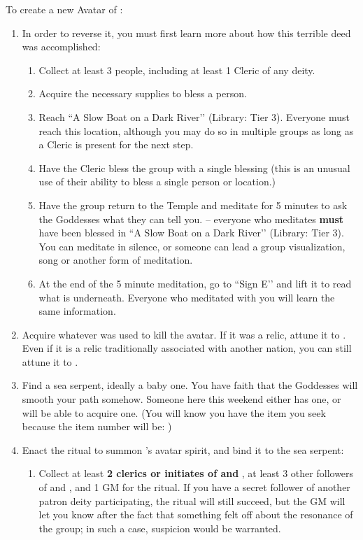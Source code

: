 \documentclass[green]{GL2020}
\begin{document}
To create a new Avatar of \cEbb{}:
\begin{enumerate}
  \item In order to reverse it, you must first learn more about how this terrible deed was accomplished: 
\begin{enumerate}
	\item Collect at least 3 people, including at least 1 Cleric of any deity.
	\item Acquire the  necessary supplies to bless a person.
	\item Reach ``A Slow Boat on a Dark River’’ (Library: Tier 3). Everyone must reach this location, although you may do so in multiple groups as long as a Cleric is present for the next step.
	\item Have the Cleric bless the group with a single blessing (this is an unusual use of their ability to bless a single person or location.)
	\item Have the group return to the Temple and meditate for 5 minutes to ask the Goddesses what they can tell you. -- everyone who meditates \textbf{must} have been blessed in ``A Slow Boat on a Dark River’’ (Library: Tier 3). You can meditate in silence, or someone can lead a group visualization, song or another form of meditation.
	\item At the end of the 5 minute meditation, go to ``Sign E’’ and lift it to read what is underneath. Everyone who meditated with you will learn the same information.
\end{enumerate}
  \item Acquire whatever was used to kill the \cEbb{} avatar. If it was a relic, attune it to \pShip{}. Even if it is a relic traditionally associated with another nation, you can still attune it to \pShip{}.
  \item Find a sea serpent, ideally a baby one. You have faith that the Goddesses will smooth your path somehow. Someone here this weekend either has one, or will be able to acquire one. (You will know you have the item you seek because the item number will be: \iBabySeaSerpent{\MYnumber})
  \item Enact the ritual to summon \cEbb{}’s avatar spirit, and bind it to the sea serpent:
  \begin{enumerate}
    \item Collect at least \textbf{2 clerics or initiates of \cEbb{} and \cFlow{}}, at least 3 other followers of \cEbb{} and \cFlow{}, and 1 GM for the ritual. If you have a secret follower of another patron deity participating, the ritual will still succeed, but the GM will let you know after the fact that something felt off about the resonance of the group; in such a case, suspicion would be warranted. 

\end{enumerate}
\end{enumerate}
\end{document}

